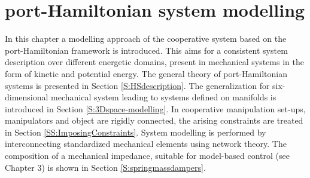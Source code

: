 \documentclass[a4paper,twoside, openright,12pt]{report}
\begin{document}
\chapter{port-Hamiltonian system modelling}
In this chapter a modelling approach of the cooperative   system based on the port-Hamiltonian framework is introduced. This aims for a consistent system description over different energetic domains, present in mechanical systems in the form of kinetic and potential energy. The general theory of port-Hamiltonian systems is presented in Section \ref{S:HSdescription}. The generalization for six-dimensional mechanical system leading to systems defined on manifolds is introduced in Section \ref{S:3Dspace-modelling}. In cooperative manipulation set-ups, manipulators and object are rigidly connected, the arising constraints are treated in Section \ref{SS:ImposingConstraints}. 
System modelling is performed by interconnecting standardized mechanical elements using network theory. The composition of a mechanical impedance, suitable for model-based control (see Chapter 3) is shown in Section \ref{S:springmassdampers}.
  
\end{document}
